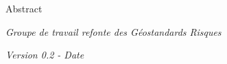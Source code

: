 \documentclass[a4paper,12pt]{article}
\begin{document}
\begin{titlepage}
    \vspace{1cm}

    {\marianne\normalsize Abstract\par}

    \vspace{5cm}

    {\marianne\small\itshape Groupe de travail refonte des Géostandards Risques\par}
    \vspace{0.3cm}
    {\marianne\small\itshape Version 0.2 - Date\par}


\end{titlepage}

\newpage
\thispagestyle{empty}
\mbox{}
\newpage
\end{document}
